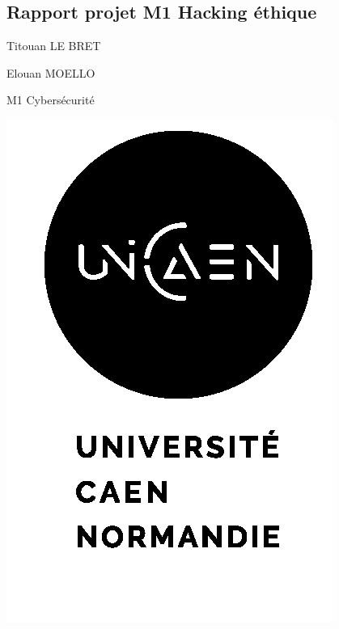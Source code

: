 \documentclass[12pt]{article} %
\begin{document}
\begin{center}


\section*{Rapport projet M1 Hacking éthique}

Titouan LE BRET

Elouan MOELLO

M1 Cybersécurité

\bigskip


\includegraphics[scale=1.2]{images/LogoUNICAEN}
\begin{figure}[!h]
\label{}
\end{figure}
\end{center}



\newpage

\renewcommand{\contentsname}{Sommaire}
\tableofcontents




\newpage
\end{document}
